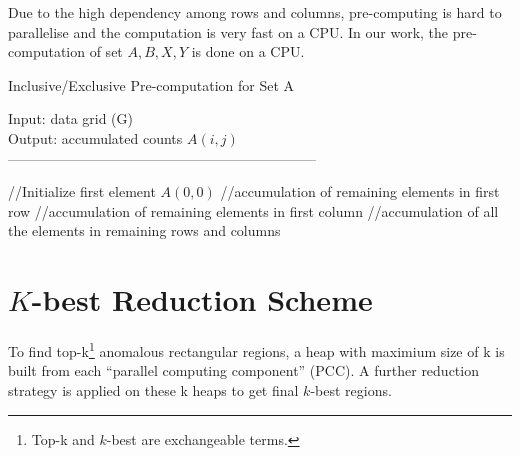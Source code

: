\documentclass[AMA,LATO1COL]{WileyNJD-v2-bak}
\begin{document}
Due to the high dependency among rows and columns, pre-computing is hard to parallelise and the computation is very fast on a CPU. In our work, the pre-computation of set $A, B, X, Y$ is done on a CPU.

\begin{algorithm}[t!]
\caption{Inclusive/Exclusive Pre-computation for Set A}\label{preinex}
Input: data grid (G) \\
Output: accumulated counts $A(i,j)$\\
------------------------------------------------------------------ \\
\begin{algorithmic}[1]
\State //Initialize first element $A(0,0)$
\State //accumulation of remaining elements in first row
\EndFor
\State //accumulation of remaining elements in first column
\EndFor
\State //accumulation of all the elements in remaining rows and columns
\EndFor
{}
\EndFor
\EndFor
\end{algorithmic}
\end{algorithm}
\section{ $K$-best Reduction Scheme}\label{KBEST}
To find top-k\footnote{Top-k and $k$-best are exchangeable terms.} anomalous rectangular regions, a heap with maximium size of k is built from each ``parallel computing component'' (PCC). A further reduction strategy is applied on these k heaps to get final $k$-best regions.
\end{document}
